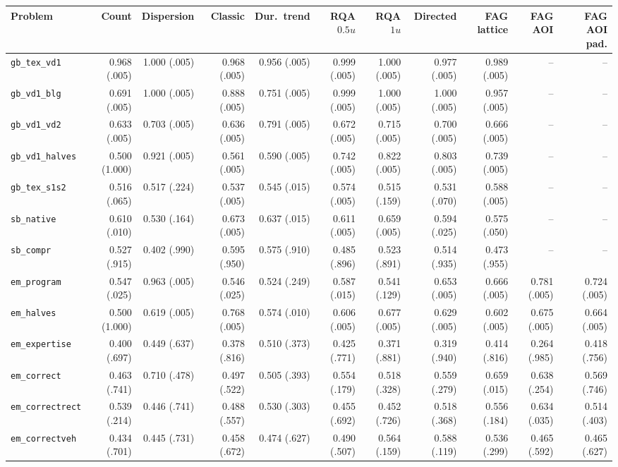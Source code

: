 \begin{tabular}{lrrrrrrrrrr}
\toprule
Problem & Count & Dispersion & Classic & Dur.\ trend & RQA $0.5u$ & RQA $1u$ & Directed & FAG lattice & FAG AOI & FAG AOI pad. \\
\midrule
\texttt{gb\_tex\_vd1} & 0.968 (.005) & 1.000 (.005) & 0.968 (.005) & 0.956 (.005) & 0.999 (.005) & 1.000 (.005) & 0.977 (.005) & 0.989 (.005) & -- & -- \\
\texttt{gb\_vd1\_blg} & 0.691 (.005) & 1.000 (.005) & 0.888 (.005) & 0.751 (.005) & 0.999 (.005) & 1.000 (.005) & 1.000 (.005) & 0.957 (.005) & -- & -- \\
\texttt{gb\_vd1\_vd2} & 0.633 (.005) & 0.703 (.005) & 0.636 (.005) & 0.791 (.005) & 0.672 (.005) & 0.715 (.005) & 0.700 (.005) & 0.666 (.005) & -- & -- \\
\texttt{gb\_vd1\_halves} & 0.500 (1.000) & 0.921 (.005) & 0.561 (.005) & 0.590 (.005) & 0.742 (.005) & 0.822 (.005) & 0.803 (.005) & 0.739 (.005) & -- & -- \\
\texttt{gb\_tex\_s1s2} & 0.516 (.065) & 0.517 (.224) & 0.537 (.005) & 0.545 (.015) & 0.574 (.005) & 0.515 (.159) & 0.531 (.070) & 0.588 (.005) & -- & -- \\
\texttt{sb\_native} & 0.610 (.010) & 0.530 (.164) & 0.673 (.005) & 0.637 (.015) & 0.611 (.005) & 0.659 (.005) & 0.594 (.025) & 0.575 (.050) & -- & -- \\
\texttt{sb\_compr} & 0.527 (.915) & 0.402 (.990) & 0.595 (.950) & 0.575 (.910) & 0.485 (.896) & 0.523 (.891) & 0.514 (.935) & 0.473 (.955) & -- & -- \\
\texttt{em\_program} & 0.547 (.025) & 0.963 (.005) & 0.546 (.025) & 0.524 (.249) & 0.587 (.015) & 0.541 (.129) & 0.653 (.005) & 0.666 (.005) & 0.781 (.005) & 0.724 (.005) \\
\texttt{em\_halves} & 0.500 (1.000) & 0.619 (.005) & 0.768 (.005) & 0.574 (.010) & 0.606 (.005) & 0.677 (.005) & 0.629 (.005) & 0.602 (.005) & 0.675 (.005) & 0.664 (.005) \\
\texttt{em\_expertise} & 0.400 (.697) & 0.449 (.637) & 0.378 (.816) & 0.510 (.373) & 0.425 (.771) & 0.371 (.881) & 0.319 (.940) & 0.414 (.816) & 0.264 (.985) & 0.418 (.756) \\
\texttt{em\_correct} & 0.463 (.741) & 0.710 (.478) & 0.497 (.522) & 0.505 (.393) & 0.554 (.179) & 0.518 (.328) & 0.559 (.279) & 0.659 (.015) & 0.638 (.254) & 0.569 (.746) \\
\texttt{em\_correctrect} & 0.539 (.214) & 0.446 (.741) & 0.488 (.557) & 0.530 (.303) & 0.455 (.692) & 0.452 (.726) & 0.518 (.368) & 0.556 (.184) & 0.634 (.035) & 0.514 (.403) \\
\texttt{em\_correctveh} & 0.434 (.701) & 0.445 (.731) & 0.458 (.672) & 0.474 (.627) & 0.490 (.507) & 0.564 (.159) & 0.588 (.119) & 0.536 (.299) & 0.465 (.592) & 0.465 (.627) \\
\bottomrule
\end{tabular}
